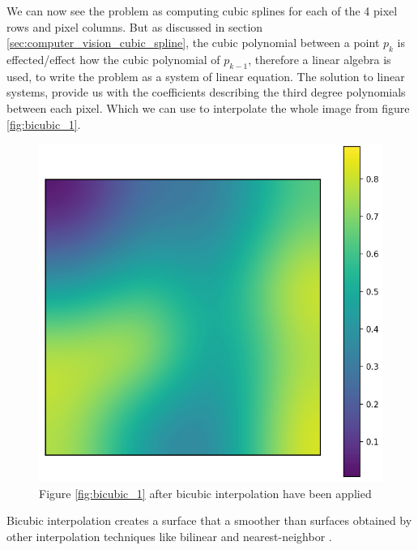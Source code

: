 \documentclass[11pt]{article}
\begin{document}
We can now see the problem as computing cubic splines for each of the 4 pixel rows and pixel columns. But as discussed in section \ref{sec:computer_vision_cubic_spline}, the cubic polynomial between a point $p_{k}$ is effected/effect how the cubic polynomial of $p_{k - 1}$, therefore a linear algebra is used, to write the problem as a system of linear equation. The solution to linear systems, provide us with the coefficients describing the third degree polynomials between each pixel. Which we can use to interpolate the whole image from figure \ref{fig:bicubic_1}.
\begin{figure}[!h]
    \centering
    \includegraphics[scale=0.25]{figurer/computer_vision/bicubic_3.png}
    \caption{Figure \ref{fig:bicubic_1} after bicubic interpolation have been applied}
    \label{fig:computer_vision_cut}
\end{figure}

Bicubic interpolation creates a surface that a smoother than surfaces obtained by other interpolation techniques like bilinear and nearest-neighbor \cite{Bicubic_interpolation}.
\end{document}
